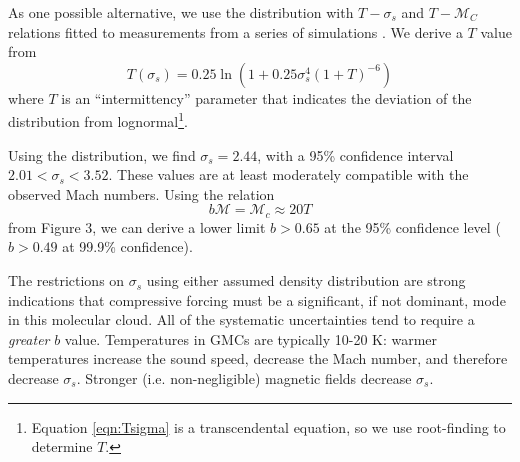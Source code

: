 
As one possible alternative, we use the
\citet{Hopkins2013a} distribution with $T-\sigma_s$ and $T-\mathcal{M}_C$
relations fitted to measurements from a series of simulations
\citep{Kowal2007a,Kritsuk2007a,Schmidt2009a,Federrath2010a,Federrath2012a,Konstandin2012a,Molina2012a}.
We derive a $T$ value from 
\begin{equation} 
    \label{eqn:Tsgima}
    T(\sigma_s) = 0.25 \ln (1+0.25 \sigma_s^4 (1+T)^{-6})
\end{equation}
where $T$ is an ``intermittency'' parameter that indicates the
deviation of the distribution from lognormal\footnote{Equation \ref{eqn:Tsigma}
is a transcendental equation, so we use root-finding to determine $T$.}.  

Using the \citet{Hopkins2013a} distribution, we find $\sigma_s=2.44$, with
a 95\% confidence interval $2.01 < \sigma_s < 3.52$.  These values are at least
moderately compatible with the observed Mach numbers.  Using the relation 
\begin{equation}
    \label{eqn:McMT}
    b \mathcal{M} = \mathcal{M}_c  \approx 20 T
\end{equation}
from \citet{Hopkins2013a} Figure 3, we can derive a lower limit $b>0.65$ at the
95\% confidence level ($b>0.49$ at 99.9\% confidence).


% 
% 
% 


The restrictions on $\sigma_s$ using either assumed density distribution are
strong indications that compressive forcing must be a significant, if not
dominant, mode in this molecular cloud.  
All of the systematic uncertainties tend to require a \emph{greater} $b$
value.  Temperatures in GMCs are typically 10-20 K: warmer temperatures
increase the sound speed, decrease the Mach number, and therefore decrease
$\sigma_s$.  Stronger (i.e. non-negligible) magnetic fields decrease
$\sigma_s$.


